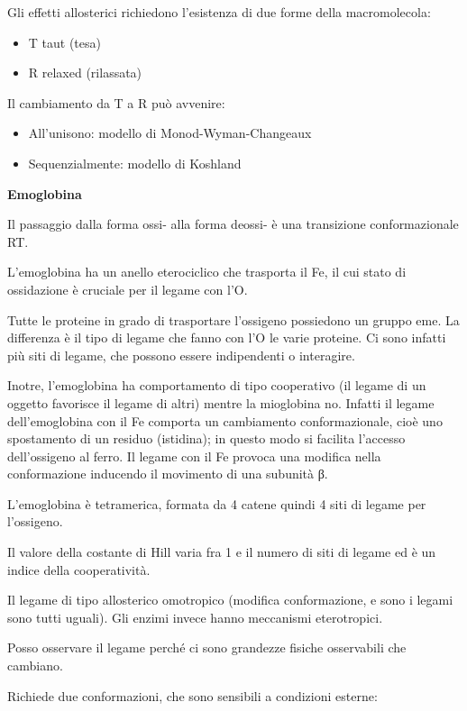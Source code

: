 Gli effetti allosterici richiedono l'esistenza di due forme della
macromolecola:

\begin{itemize}
\item
  T taut (tesa)
\item
  R relaxed (rilassata)
\end{itemize}

Il cambiamento da T a R può avvenire:

\begin{itemize}
\item
  All'unisono: modello di Monod-Wyman-Changeaux
\item
  Sequenzialmente: modello di Koshland
\end{itemize}

\textbf{Emoglobina}

Il passaggio dalla forma ossi- alla forma deossi- è una transizione
conformazionale RT.

L'emoglobina ha un anello eterociclico che trasporta il Fe, il cui stato
di ossidazione è cruciale per il legame con l'O.

Tutte le proteine in grado di trasportare l'ossigeno possiedono un
gruppo eme. La differenza è il tipo di legame che fanno con l'O le varie
proteine. Ci sono infatti più siti di legame, che possono essere
indipendenti o interagire.

Inotre, l'emoglobina ha comportamento di tipo cooperativo (il legame di
un oggetto favorisce il legame di altri) mentre la mioglobina no.
Infatti il legame dell'emoglobina con il Fe comporta un cambiamento
conformazionale, cioè uno spostamento di un residuo (istidina); in
questo modo si facilita l'accesso dell'ossigeno al ferro. Il legame con
il Fe provoca una modifica nella conformazione inducendo il movimento di
una subunità β.

L'emoglobina è tetramerica, formata da 4 catene quindi 4 siti di legame
per l'ossigeno.

Il valore della costante di Hill varia fra 1 e il numero di siti di
legame ed è un indice della cooperatività.

Il legame di tipo allosterico omotropico (modifica conformazione, e sono
i legami sono tutti uguali). Gli enzimi invece hanno meccanismi
eterotropici.

Posso osservare il legame perché ci sono grandezze fisiche osservabili
che cambiano.

Richiede due conformazioni, che sono sensibili a condizioni esterne:

